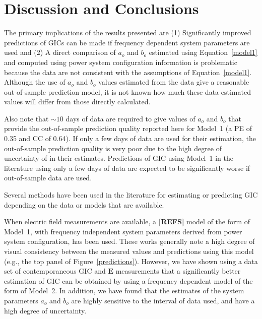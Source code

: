 \documentclass[draft,linenumbers]{agujournal2018}
\begin{document}

\section{Discussion and Conclusions}

The primary implications of the results presented are (1) Significantly improved predictions of GICs can be made if frequency dependent system parameters are used and (2) A direct comparison of $a_o$ and $b_o$ estimated using Equation~\ref{model1} and computed using power system configuration information is problematic because the data are not consistent with the assumptions of Equation~\ref{model1}. Although the use of $a_o$ and $b_o$ values estimated from the data give a reasonable out-of-sample prediction model, it is not known how much these data estimated values will differ from those directly calculated. 

Also note that $\sim 10$ days of data are required to give values of $a_o$ and $b_o$ that provide the out-of-sample prediction quality reported here for Model~1 (a PE of 0.35 and CC of 0.64). If only a few days of data are used for their estimation, the out-of-sample prediction quality is very poor due to the high degree of uncertainty of in their estimates. Predictions of GIC using Model~1 in the literature using only a few days of data are expected to be significantly worse if out-of-sample data are used.

Several methods have been used in the literature for estimating or predicting GIC depending on the data or models that are available.

When electric field measurements are available, a  {\color{red} \textbf{[REFS]}} model of the form of Model~1, with frequency independent system parameters derived from power system configuration, has been used. These works generally note a high degree of visual consistency between the measured values and predictions using this model (e.g., the top panel of Figure~\ref{predictions}). However, we have shown using a data set of contemporaneous GIC and $\mathbf{E}$ measurements that a significantly better estimation of GIC can be obtained by using a frequency dependent model of the form of Model~2. In addition, we have found that the estimates of the system parameters $a_o$ and $b_o$ are highly sensitive to the interval of data used, and have a high degree of uncertainty.
\end{document}
